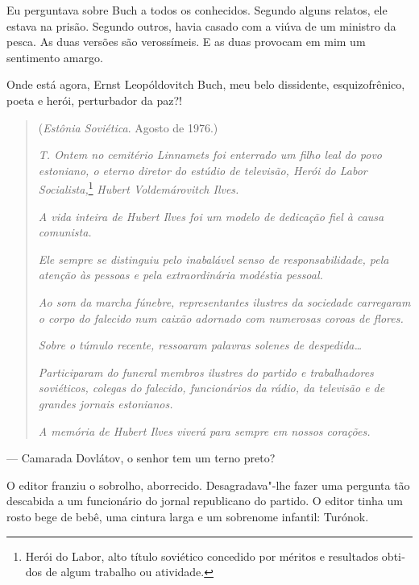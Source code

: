 Eu perguntava sobre Buch a todos os conhecidos. Segundo alguns relatos,
ele estava na prisão. Segundo outros, havia casado com a viúva de um
ministro da pesca. As duas versões são verossímeis. E as duas provocam
em mim um sentimento amargo.

Onde está agora, Ernst Leopóldovitch Buch, meu belo dissidente,
esquizofrênico, poeta e herói, perturbador da paz?!

\movetooddpage
\begin{center}
{}
\end{center}

\begin{quotation}
\begin{flushright}
(\emph{Estônia Soviética}. Agosto de 1976.)
\end{flushright}
\vspace{4pt}
\noindent\emph{T. Ontem no cemitério Linnamets foi
enterrado um filho leal do povo estoniano, o eterno diretor do estúdio
de televisão, Herói do Labor Socialista,}\footnote{Herói do Labor, alto
  título soviético concedido por méritos e resultados obti­dos de algum
  trabalho ou atividade.} \emph{Hubert Voldemárovitch Ilves.}

\emph{A vida inteira de Hubert Ilves foi um modelo de dedicação fiel à
causa comunista.}

\emph{Ele sempre se distinguiu pelo inabalável senso de
responsabilidade, pela atenção às pessoas e pela extraordinária modéstia
pessoal.}

\emph{Ao som da marcha fúnebre, representantes ilustres da sociedade
carregaram o corpo do falecido num caixão adornado com numerosas coroas
de flores.}

\emph{Sobre o túmulo recente, ressoaram palavras solenes de
despedida\ldots{}}

\emph{Participaram do funeral membros ilustres do partido e
trabalhadores soviéticos, colegas do falecido, funcionários da rádio, da
televisão e de grandes jornais estonianos.}

\emph{A memória de Hubert Ilves viverá para sempre em nossos corações.}
\end{quotation}

--- Camarada Dovlátov, o senhor tem um terno preto?

O editor franziu o sobrolho, aborrecido. Desagradava"-lhe fazer uma
pergunta tão descabida a um funcionário do jornal republicano do
partido. O editor tinha um rosto bege de bebê, uma cintura larga e um
sobrenome infantil: Turónok.

